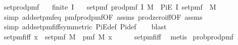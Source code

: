 \begin{isabellebody}
\endisatagproof
{\isafoldproof}%
%
\isadelimproof
\isanewline
%
\endisadelimproof
\isanewline
{}\isamarkupfalse%
\ set{\isacharunderscore}{\kern0pt}prod{\isacharunderscore}{\kern0pt}pmf{\isacharcolon}{\kern0pt}\isanewline
\ \ \ {\isachardoublequoteopen}finite\ I{\isachardoublequoteclose}\isanewline
\ \ \ {\isachardoublequoteopen}set{\isacharunderscore}{\kern0pt}pmf\ {\isacharparenleft}{\kern0pt}prod{\isacharunderscore}{\kern0pt}pmf\ I\ M{\isacharparenright}{\kern0pt}\ {\isacharequal}{\kern0pt}\ PiE\ I\ {\isacharparenleft}{\kern0pt}set{\isacharunderscore}{\kern0pt}pmf\ {\isasymcirc}\ M{\isacharparenright}{\kern0pt}{\isachardoublequoteclose}\isanewline
%
\isadelimproof
\ \ %
\endisadelimproof
%
\isatagproof
{}\isamarkupfalse%
\ {\isacharparenleft}{\kern0pt}simp\ add{\isacharcolon}{\kern0pt}set{\isacharunderscore}{\kern0pt}pmf{\isacharunderscore}{\kern0pt}eq\ pmf{\isacharunderscore}{\kern0pt}prod{\isacharunderscore}{\kern0pt}pmf{\isacharbrackleft}{\kern0pt}OF\ assms{\isacharparenleft}{\kern0pt}{}{\isacharparenright}{\kern0pt}{\isacharbrackright}{\kern0pt}\ prod{\isacharunderscore}{\kern0pt}zero{\isacharunderscore}{\kern0pt}iff{\isacharbrackleft}{\kern0pt}OF\ assms{\isacharparenleft}{\kern0pt}{}{\isacharparenright}{\kern0pt}{\isacharbrackright}{\kern0pt}{\isacharparenright}{\kern0pt}\isanewline
\ \ \isamarkupfalse%
\ {\isacharparenleft}{\kern0pt}simp\ add{\isacharcolon}{\kern0pt}set{\isacharunderscore}{\kern0pt}pmf{\isacharunderscore}{\kern0pt}iff{\isacharbrackleft}{\kern0pt}symmetric{\isacharbrackright}{\kern0pt}\ PiE{\isacharunderscore}{\kern0pt}def\ Pi{\isacharunderscore}{\kern0pt}def{\isacharparenright}{\kern0pt}\isanewline
\ \ \isamarkupfalse%
\ blast%
\endisatagproof
{\isafoldproof}%
%
\isadelimproof
\isanewline
%
\endisadelimproof
\isanewline
{}\isamarkupfalse%
\ set{\isacharunderscore}{\kern0pt}pmf{\isacharunderscore}{\kern0pt}iff{\isacharprime}{\kern0pt}{\isacharcolon}{\kern0pt}\ {\isachardoublequoteopen}x\ {\isasymnotin}\ set{\isacharunderscore}{\kern0pt}pmf\ M\ {\isasymlongleftrightarrow}\ pmf\ M\ x\ {\isacharequal}{\kern0pt}\ {}{\isachardoublequoteclose}\isanewline
%
\isadelimproof
\ \ %
\endisadelimproof
%
\isatagproof
{}\isamarkupfalse%
\ set{\isacharunderscore}{\kern0pt}pmf{\isacharunderscore}{\kern0pt}iff\ \isamarkupfalse%
\ metis%
\endisatagproof
{\isafoldproof}%
%
\isadelimproof
\isanewline
%
\endisadelimproof
\isanewline
{}\isamarkupfalse%
\ prob{\isacharunderscore}{\kern0pt}prod{\isacharunderscore}{\kern0pt}pmf{\isacharcolon}{\kern0pt}\isanewline

\end{isabellebody}
